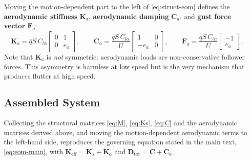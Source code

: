 \documentclass[
	a4paper, %
	10pt, %
]{CSUniSchoolLabReport}
\begin{document}
Moving the motion-dependent part to the left of \eqref{eq:struct-eom} defines the
\textbf{aerodynamic stiffness} \(\mathbf K_a\), \textbf{aerodynamic damping} \(\mathbf C_a\), and \textbf{gust force vector} \(\mathbf F_g\):
\begin{equation}
    \boxed{\ \mathbf K_a = \bar{q} S\, C_{l\alpha}\!
        \begin{bmatrix} 0 & 1 \\ 0 & e_a \end{bmatrix},\qquad
        \mathbf C_a = \frac{\bar{q} S\, C_{l\alpha}}{U}\!
        \begin{bmatrix} 1 & 0 \\ -e_a & 0 \end{bmatrix},\qquad
        \mathbf F_g = \frac{\bar{q} S\, C_{l\alpha}}{U}\!
        \begin{bmatrix} -1 \\ e_a \end{bmatrix}.\ }
\end{equation}
Note that \(\mathbf K_a\) is \emph{not} symmetric: aerodynamic loads are
non-conservative follower forces. This asymmetry is harmless at low speed but is
the very mechanism that produces flutter at high speed.

\subsection{Assembled System}
Collecting the structural matrices \eqref{eq:M}, \eqref{eq:Ks}, \eqref{eq:C} and the
aerodynamic matrices derived above, and moving the motion-dependent aerodynamic terms to the
left-hand side, reproduces the governing equation stated in the main text,
\cref{eq:eom-main}, with \(\mathbf K_{\text{eff}}=\mathbf K_s+\mathbf K_a\) and
\(\mathbf D_{\text{tot}}=\mathbf C+\mathbf C_a\).
\end{document}
